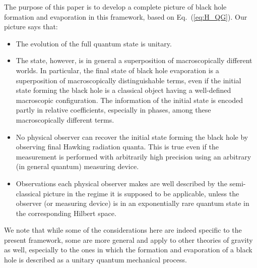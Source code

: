\documentclass[12pt]{article}
\begin{document}
The purpose of this paper is to develop a complete picture of black hole 
formation and evaporation in this framework, based on Eq.~(\ref{eq:H_QG}). 
Our picture says that:
%
\begin{itemize}
%
\item
The evolution of the full quantum state is unitary.
%
\item
The state, however, is in general a superposition of macroscopically 
different worlds.  In particular, the final state of black hole evaporation 
is a superposition of macroscopically distinguishable terms, even if 
the initial state forming the black hole is a classical object having 
a well-defined macroscopic configuration.  The information of the initial 
state is encoded partly in relative coefficients, especially in phases, 
among these macroscopically different terms.
%
\item
No physical observer can recover the initial state forming the black hole 
by observing final Hawking radiation quanta.  This is true even if the 
measurement is performed with arbitrarily high precision using an arbitrary 
(in general quantum) measuring device.
%
\item
Observations each physical observer makes are well described by the 
semi-classical picture in the regime it is supposed to be applicable, 
unless the observer (or measuring device) is in an exponentially rare 
quantum state in the corresponding Hilbert space.
%
\end{itemize}
%
We note that while some of the considerations here are indeed specific 
to the present framework, some are more general and apply to other theories 
of gravity as well, especially to the ones in which the formation and 
evaporation of a black hole is described as a unitary quantum mechanical 
process.
\end{document}
